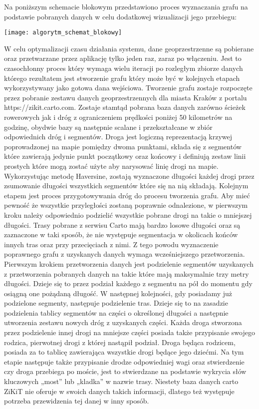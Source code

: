 Na poniższym schemacie blokowym przedstawiono proces wyznaczania grafu na podstawie pobranych danych w celu dodatkowej wizualizacji jego przebiegu:

\begin{center}
\texttt{[image: algorytm\_schemat\_blokowy]}
\end{center}

W celu optymalizacji czasu działania systemu, dane geoprzestrzenne są pobierane oraz przetwarzane przez aplikację tylko jeden raz, zaraz po włączeniu. Jest to czasochłonny proces który wymaga wielu iteracji po rozległym zbiorze danych którego rezultatem jest stworzenie grafu który może być w kolejnych etapach wykorzystywany jako gotowa dana wejściowa. Tworzenie grafu zostaje rozpoczęte przez pobranie zestawu danych geoprzestrzennych dla miasta Kraków z portalu https://zikit.carto.com. Zostaje stamtąd pobrana baza danych zarówno ścieżek rowerowych jak i dróg z ograniczeniem prędkości poniżej 50 kilometrów na godzinę, obydwie bazy są następnie scalane i przekształcane w zbiór odpowiednich dróg i segmentów. Droga jest logiczną reprezentacją krzywej poprowadzonej na mapie pomiędzy dwoma punktami, składa się z segmentów które zawierają jedynie punkt początkowy oraz końcowy i definiują zestaw linii prostych które mogą zostać użyte aby narysować linię drogi na mapie. Wykorzystując metodę Haversine, zostają wyznaczone długości każdej drogi przez zsumowanie długości wszystkich segmentów które się na nią składają. \newline
Kolejnym etapem jest proces przygotowywania dróg do procesu tworzenia grafu. Aby mieć pewność że wszystkie przyległości zostaną poprawnie odnalezione, w pierwszym kroku należy odpowiednio podzielić wszystkie pobrane drogi na takie o mniejszej długości. Trasy pobrane z serwisu Carto mają bardzo losowe długości oraz są zaznaczone w taki sposób, że nie występuje segmentacja w okolicach końców innych tras oraz przy przecięciach z nimi. Z tego powodu wyznaczenie poprawnego grafu z uzyskanych danych wymaga wcześniejszego przetworzenia. Pierwszym krokiem przetworzenia danych jest podzielenie segmentów uzyskanych z przetworzenia pobranych danych na takie które mają maksymalnie trzy metry długości. Dzieje się to przez podział każdego z segmentu na pół do momentu gdy osiągną one pożądaną długość. W następnej kolejności, gdy posiadamy już podzielone segmenty, następuje podzielenie tras. Dzieje się to na zasadzie podzielenia tablicy segmentów na części o określonej długości a następnie utworzenia zestawu nowych dróg z uzyskanych części. Każda droga stworzona przez podzielenie innej drogi na mniejsze części posiada także przypisanie swojego rodzica, pierwotnej drogi z której nastąpił podział. Droga będąca rodzicem, posiada za to tablicę zawierająca wszystkie drogi będące jego dziećmi. Na tym etapie następuje także przypisanie drodze odpowiedniej wagi oraz stwierdzenie czy droga przebiega po moście, jest to stwierdzane na podstawie wykrycia słów kluczowych „most” lub „kladka” w nazwie trasy. Niestety baza danych carto ZiKiT nie oferuje w swoich danych takich informacji, dlatego też występuje potrzeba przewidzenia tej danej w inny sposób. \newline

